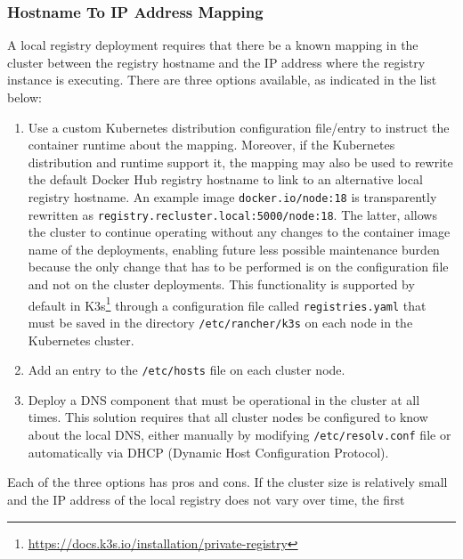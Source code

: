 \subsubsection{Hostname To IP Address Mapping}
\label{subsubsec:implementation_dependencies_docker_registry_hostname_to_ip_address_mapping}

A local registry deployment requires that there be a known mapping in the
cluster between the registry hostname and the IP address where the registry
instance is executing. There are three options available, as indicated in the
list below:
\begin{enumerate}
  \item Use a custom Kubernetes distribution configuration file/entry to instruct
    the container runtime about the mapping. Moreover, if the Kubernetes distribution
    and runtime support it, the mapping may also be used to rewrite the default
    Docker Hub registry hostname to link to an alternative local registry
    hostname. An example image \texttt{docker.io/node:18} is transparently
    rewritten as \texttt{registry.recluster.local:5000/node:18}. The latter, allows
    the cluster to continue operating without any changes to the container image
    name of the deployments, enabling future less possible maintenance burden
    because the only change that has to be performed is on the configuration
    file and not on the cluster deployments.
    \newline
    This functionality is supported by default in K3s\footnote{\url{https://docs.k3s.io/installation/private-registry}}
    through a configuration file called \texttt{registries.yaml} that must be
    saved in the directory \texttt{/etc/rancher/k3s} on each node in the
    Kubernetes cluster.

  \item Add an entry to the \texttt{/etc/hosts} file on each cluster node.

  \item Deploy a DNS component that must be operational in the cluster at all times.
    \newline
    This solution requires that all cluster nodes be configured to know about
    the local DNS, either manually by modifying \texttt{/etc/resolv.conf} file or
    automatically via DHCP (Dynamic Host Configuration Protocol).
\end{enumerate}
Each of the three options has pros and cons. If the cluster size is relatively
small and the IP address of the local registry does not vary over time, the first

